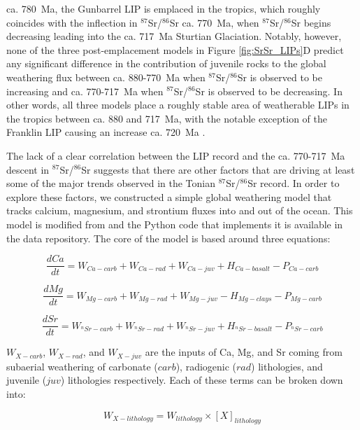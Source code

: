 \documentclass[11pt,letterpaper]{article}
\newcommand{\SrSr}{$^{87}$Sr/$^{86}$Sr\xspace}
\begin{document}
ca. 780~Ma, the Gunbarrel LIP is emplaced in the tropics, which roughly coincides with the inflection in \SrSr ca. 770~Ma, when \SrSr begins decreasing leading into the ca. 717~Ma Sturtian Glaciation. Notably, however, none of the three post-emplacement models in Figure \ref{fig:SrSr_LIPs}D predict any significant difference in the contribution of juvenile rocks to the global weathering flux between ca. 880-770~Ma when \SrSr is observed to be increasing and ca. 770-717~Ma when \SrSr is observed to be decreasing. In other words, all three models place a roughly stable area of weatherable LIPs in the tropics between ca. 880 and 717~Ma, with the notable exception of the Franklin LIP causing an increase ca. 720~Ma \citep{Denyszyn2009a}.

The lack of a clear correlation between the LIP record and the ca. 770-717~Ma descent in \SrSr suggests that there are other factors that are driving at least some of the major trends observed in the Tonian \SrSr record. In order to explore these factors, we constructed a simple global weathering model that tracks calcium, magnesium, and strontium fluxes into and out of the ocean. This model is modified from \citet{Maloof2010a} and the Python code that implements it is available in the data repository. The core of the model is based around three equations:

\begin{equation}
  \frac{dCa}{dt} = W_{Ca-carb} + W_{Ca-rad} + W_{Ca-juv} + H_{Ca-basalt} - P_{Ca-carb}
\end{equation}

\begin{equation}
  \frac{dMg}{dt} = W_{Mg-carb} + W_{Mg-rad} + W_{Mg-juv} - H_{Mg-clays} - P_{Mg-carb}
\end{equation}

\begin{equation}
  \frac{dSr}{dt} = W_{^{n}Sr-carb} + W_{^{n}Sr-rad} + W_{^{n}Sr-juv} + H_{^{n}Sr-basalt} - P_{^{n}Sr-carb}
\end{equation}

$W_{X-carb}$, $W_{X-rad}$, and $W_{X-juv}$ are the inputs of Ca, Mg, and Sr coming from subaerial weathering of carbonate ($carb$), radiogenic ($rad$) lithologies, and juvenile ($juv$) lithologies respectively. Each of these terms can be broken down into:

\begin{equation}
	W_{X-lithology} = W_{lithology} \times [X]_{lithology}
\end{equation}
\end{document}
